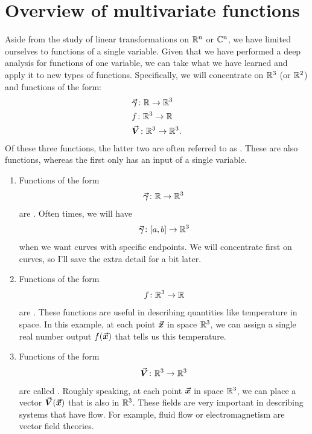    
        \section{Overview of multivariate functions}
        Aside from the study of linear transformations on $\mathbb{R}^n$ or $\mathbb{C}^n$, we have limited ourselves to functions of a single variable.  Given that we have performed a deep analysis for functions of one variable, we can take what we have learned and apply it to new types of functions. Specifically, we will concentrate on $\mathbb{R}^3$ (or $\mathbb{R}^2$) and functions of the form:
        \begin{align*}
            &\boldsymbol{\vec{\gamma}}\colon \mathbb{R} \to \mathbb{R}^3\\
            &f\colon \mathbb{R}^3 \to \mathbb{R}\\
            &\boldsymbol{\vec{V}} \colon \mathbb{R}^3 \to \mathbb{R}^3.
        \end{align*}
        Of these three functions, the latter two are often referred to as .  These are also  functions, whereas the first only has an input of a single variable.
        
        
        \begin{enumerate}[(1)]
        \item Functions of the form
        \[
        \boldsymbol{\vec{\gamma}} \colon \mathbb{R}\to \mathbb{R}^3
        \]
        are .  Often times, we will have 
        \[
        \boldsymbol{\vec{\gamma}} \colon [a,b]\to \mathbb{R}^3
        \]
        when we want curves with specific endpoints. We will concentrate first on curves, so I'll save the extra detail for a bit later.
        
        \item Functions of the form
        \[
        f\colon \mathbb{R}^3 \to \mathbb{R}
        \]
        are  .   These functions are useful in describing quantities like temperature in space.  In this example, at each point $\boldsymbol{\boldsymbol{\vec{x}}}$ in space $\mathbb{R}^3$, we can assign a single real number output $f(\boldsymbol{\boldsymbol{\vec{x}}})$ that tells us this temperature.  
        
        
        \item Functions of the form
        \[
        \boldsymbol{\vec{V}} \colon \mathbb{R}^3 \to \mathbb{R}^3
        \]
        are called .  Roughly speaking, at each point $\boldsymbol{\boldsymbol{\vec{x}}}$ in space $\mathbb{R}^3$, we can place a vector $\boldsymbol{\vec{V}}(\boldsymbol{\boldsymbol{\vec{x}}})$ that is also in $\mathbb{R}^3$.  These fields are very important in describing systems that have flow.  For example, fluid flow or electromagnetism are vector field theories. 
        
        \end{enumerate}
        
